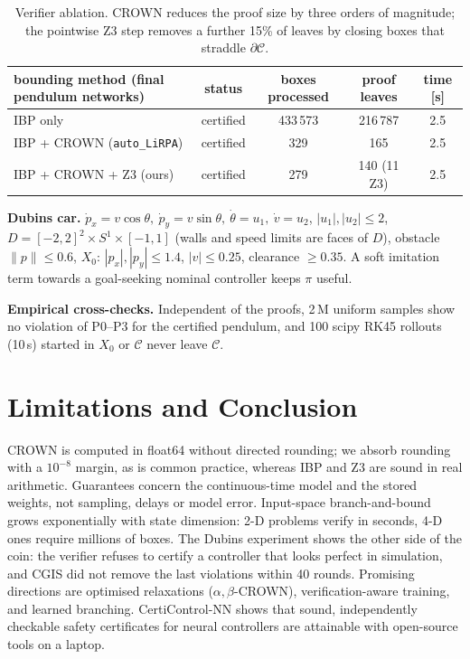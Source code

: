 \documentclass[10pt]{article}
\newcommand{\C}{\mathcal{C}}
\begin{document}
\begin{table}[h]
\centering\small
\begin{tabular}{lcccc}
\toprule
bounding method (final pendulum networks) & status & boxes processed & proof leaves & time [s]\\
\midrule
IBP only & certified & 433\,573 & 216\,787 & 2.5\\
IBP + CROWN (\texttt{auto\_LiRPA}) & certified & 329 & 165 & 2.5\\
IBP + CROWN + Z3 (ours) & certified & 279 & 140 (11 Z3) & 2.5\\
\bottomrule
\end{tabular}
\caption{Verifier ablation. CROWN reduces the proof size by three orders of magnitude; the pointwise Z3 step removes a further 15\% of leaves by closing boxes that straddle $\partial\C$.}
\label{tab:abl}
\vspace{-1em}
\end{table}

\textbf{Dubins car.} $\dot p_x=v\cos\theta,\ \dot p_y=v\sin\theta,\ \dot\theta=u_1,\ \dot v=u_2$, $|u_1|,|u_2|\le 2$, $D=[-2,2]^2\times S^1\times[-1,1]$ (walls and speed limits are faces of $D$), obstacle $\|p\|\le 0.6$, $X_0$: $|p_x|,|p_y|\le1.4$, $|v|\le0.25$, clearance $\ge0.35$. A soft imitation term towards a goal-seeking nominal controller keeps $\pi$ useful. \DubResults

\textbf{Empirical cross-checks.} Independent of the proofs, 2\,M uniform samples show no violation of P0--P3 for the certified pendulum, and 100 scipy RK45 rollouts (10\,s) started in $X_0$ or $\C$ never leave $\C$.

\section{Limitations and Conclusion}
CROWN is computed in float64 without directed rounding; we absorb rounding with a $10^{-8}$ margin, as is common practice, whereas IBP and Z3 are sound in real arithmetic. Guarantees concern the continuous-time model and the stored weights, not sampling, delays or model error. Input-space branch-and-bound grows exponentially with state dimension: 2-D problems verify in seconds, 4-D ones require millions of boxes. The Dubins experiment shows the other side of the coin: the verifier refuses to certify a controller that looks perfect in simulation, and CGIS did not remove the last violations within 40 rounds. Promising directions are optimised relaxations ($\alpha,\beta$-CROWN), verification-aware training, and learned branching. CertiControl-NN shows that sound, independently checkable safety certificates for neural controllers are attainable with open-source tools on a laptop.
\end{document}
